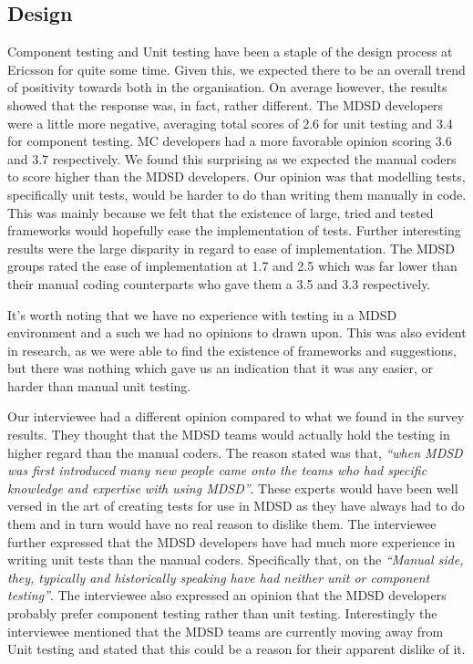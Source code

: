 \documentclass[final_report_innit.tex]{subfiles}
\begin{document}
\subsection*{Design}

Component testing and Unit testing have been a staple of the design process at Ericsson for quite some time. Given this, we expected there to be an overall trend of positivity towards both in the organisation. On average however, the results showed that the response was, in fact, rather different. The MDSD developers were a little more negative, averaging total scores of 2.6 for unit testing and 3.4 for component testing. MC developers had a more favorable opinion scoring 3.6 and 3.7 respectively. We found this surprising as we expected the manual coders to score higher than the MDSD developers. Our opinion was that modelling tests, specifically unit tests, would be harder to do than writing them manually in code. This was mainly because we felt that the existence of large, tried and tested frameworks would hopefully ease the implementation of tests. Further interesting results were the large disparity in regard to ease of implementation. The MDSD groups rated the ease of implementation at 1.7 and 2.5 which was far lower than their manual coding counterparts who gave them a 3.5 and 3.3 respectively.

It's worth noting that we have no experience with testing in a MDSD environment and a such we had no opinions to drawn upon. This was also evident in research, as we were able to find the existence of frameworks and suggestions, but there was nothing which gave us an indication that it was any easier, or harder than manual unit testing.

Our interviewee had a different opinion compared to what we found in the survey results. They thought that the MDSD teams would actually hold the testing in higher regard than the manual coders. The reason stated was that, \textit{``when MDSD was first introduced many new people came onto the teams who had specific knowledge and expertise with using MDSD''}. These experts would have been well versed in the art of creating tests for use in MDSD as they have always had to do them and in turn would have no real reason to dislike them. The interviewee further expressed that the MDSD developers have had much more experience in writing unit tests than the manual coders. Specifically that, on the \textit{``Manual side, they, typically and historically speaking have had neither unit or component testing''}.
The interviewee also expressed an opinion that the MDSD developers probably prefer component testing rather than unit testing. Interestingly the interviewee mentioned that the MDSD teams are currently moving away from Unit testing and stated that this could be a reason for their apparent dislike of it.
\end{document}
